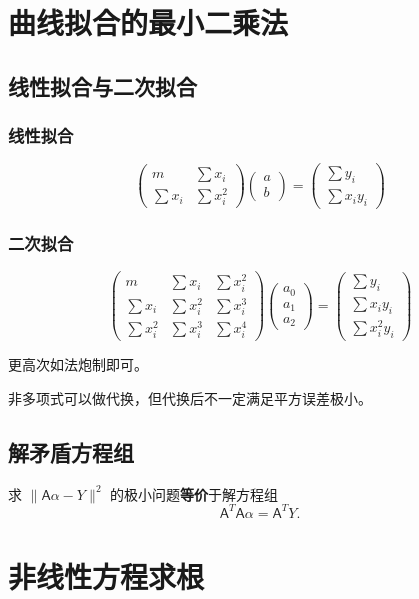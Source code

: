 \documentclass[a4paper,12pt]{article}
\begin{document}
\section{曲线拟合的最小二乘法}
\subsection{线性拟合与二次拟合}
\subsubsection{线性拟合}
$$\left(\begin{array}{cc}
m&\sum x_i\\
\sum x_i&\sum x_i^2
\end{array}\right)
\left(\begin{array}{c}
a\\
b
\end{array}\right)=
\left(\begin{array}{c}
\sum y_i\\
\sum x_iy_i
\end{array}\right)$$
\subsubsection{二次拟合}
$$\left(\begin{array}{ccc}
m&\sum x_i&\sum x_i^2\\
\sum x_i&\sum x_i^2&\sum x_i^3\\
\sum x_i^2&\sum x_i^3&\sum x_i^4
\end{array}\right)
\left(\begin{array}{c}
a_0\\
a_1\\
a_2
\end{array}\right)=
\left(\begin{array}{c}
\sum y_i\\
\sum x_iy_i\\
\sum x_i^2y_i
\end{array}\right)$$\par
更高次如法炮制即可。\par
非多项式可以做代换，但代换后不一定满足平方误差极小。
\subsection{解矛盾方程组}
求 $\|\mathsf{A}\alpha-Y\|^2$ 的极小问题\textbf{等价}于解方程组
\[
\mathsf{A}^T\mathsf{A}\alpha=\mathsf{A}^TY.
\]
\section{非线性方程求根}
\end{document}
